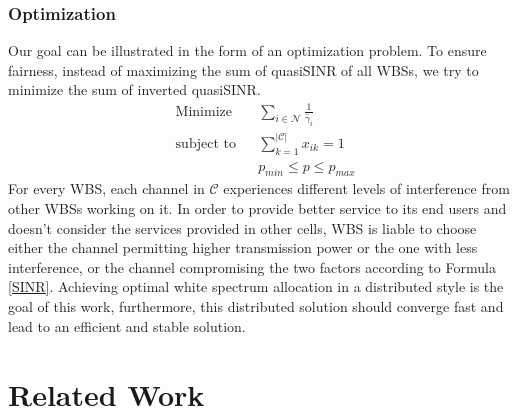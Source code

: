 \subsubsection*{Optimization}
Our goal can be illustrated in the form of an optimization problem.
To ensure fairness, instead of maximizing the sum of quasiSINR of all WBSs, we try to minimize the sum of inverted quasiSINR. 
	\begin{equation}
\label{problem}
			\begin{aligned}
			& {\text{Minimize}}
			& & \sum_{i\in \mathcal{N}}\frac{1}{\tilde{\gamma_{i}}} \\
			& \text{subject to}
			& & \sum_{k=1}^{|\mathcal{C}|}x_{ik}=1 \\
			& & & p_{min} \leq p \leq p_{max}
			\end{aligned}
		\end{equation}
For every WBS, each channel in $\mathcal{C}$ experiences different levels of interference from other WBSs working on it.
In order to provide better service to its end users and doesn't consider the services provided in other cells, WBS is liable to choose either the channel permitting higher transmission power or the one with less interference, or the channel compromising the two factors according to Formula \ref{SINR}.
 Achieving optimal white spectrum allocation in a distributed style is the goal of this work, furthermore, this distributed solution should converge fast and lead to an efficient and stable solution.


\section{Related Work}
\label{relatedWork}

